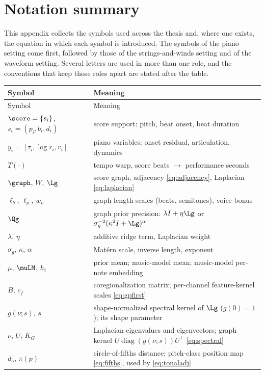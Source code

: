 \chapter{Notation summary}\label{app:notation}
This appendix collects the symbols used across the thesis and, where one
exists, the equation in which each symbol is introduced. The symbols of the
piano setting come first, followed by those of the strings-and-winds setting
and of the waveform setting. Several letters are used in more than one role,
and the conventions that keep those roles apart are stated after the table.
\begin{center}
\begin{longtable}{@{}p{4.3cm}p{9.2cm}@{}}
\toprule
Symbol & Meaning \\
\midrule
\endfirsthead
\toprule
Symbol & Meaning \\
\midrule
\endhead
\bottomrule
\endfoot
$\score = \{s_i\}$, $s_i = (p_i, b_i, d_i)$ & score support: pitch, beat onset, beat duration \\
$y_i = [\tau_i, \log r_i, v_i]$ & piano variables: onset residual, articulation, dynamics \\
$T(\cdot)$ & tempo warp, score beats $\to$ performance seconds \\
$\graph$, $W$, $\Lg$ & score graph, adjacency \eqref{eq:adjacency}, Laplacian \eqref{eq:laplacian} \\
$\ell_b$, $\ell_p$, $w_v$ & graph length scales (beats, semitones), voice bonus \\
$\Qg$ & graph prior precision: $\lambda I + \eta \Lg$ or $\sigma_g^{-2}(\kappa^2 I + \Lg)^\alpha$ \\
$\lambda$, $\eta$ & additive ridge term, Laplacian weight \\
$\sigma_g$, $\kappa$, $\alpha$ & Mat\'ern scale, inverse length, exponent \\
$\mu$, $\muLM$, $h_i$ & prior mean; music-model mean; music-model per-note embedding \\
$B$, $c_f$ & coregionalization matrix; per-channel feature-kernel scales \eqref{eq:gpfirst} \\
$g(\nu; s)$, $s$ & shape-normalized spectral kernel of $\Lg$ ($g(0){=}1$); its shape parameter \\
$\nu$, $U$, $K_G$ & Laplacian eigenvalues and eigenvectors; graph kernel $U \operatorname{diag}(g(\nu;s)) U^\top$ \eqref{eq:spectral} \\
$d_5$, $\pi(p)$ & circle-of-fifths distance; pitch-class position map \eqref{eq:fifths}, used by \eqref{eq:tonaladj} \\

\end{longtable}
\end{center}
